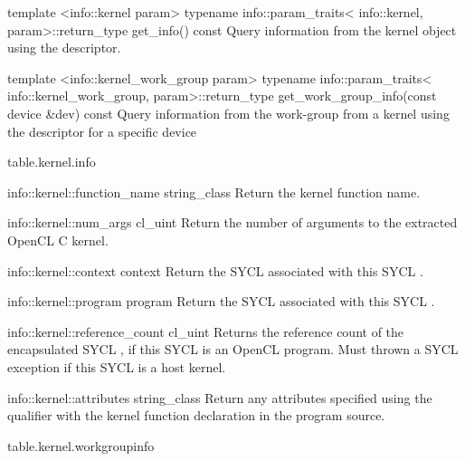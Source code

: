   \addRowFourL
    {template <info::kernel param>}
    {typename info::param_traits<}
    {info::kernel, param>::return_type}
    {get_info() const}
    {
        Query information from the kernel object using the
         descriptor.
    }


  \addRowFourL
    {template <info::kernel_work_group param>}
    {typename info::param_traits<}
    {info::kernel_work_group, param>::return_type}
    {get_work_group_info(const device \&dev) const}
    {
        Query information from the work-group from a kernel using the
         descriptor for a specific
        device
    }

\completeTable

{table.kernel.info}

\addInfoRow
{info::kernel::function_name}
{string_class}
{Return the kernel function name.}

\addInfoRow
{info::kernel::num_args}
{cl_uint}
{Return the number of arguments to the extracted OpenCL C kernel.}

\addInfoRow
{info::kernel::context}
{context}
{Return the SYCL  associated with this SYCL .}

\addInfoRow
{info::kernel::program}
{program}
{Return the SYCL  associated with this SYCL .}

\addInfoRow
{info::kernel::reference_count}
{cl_uint}
{
  Returns the reference count of the encapsulated SYCL ,
  if this SYCL  is an OpenCL program. Must thrown a  SYCL exception if this SYCL  is a host kernel.
}

\addInfoRow
{info::kernel::attributes}
{string_class}
{
  Return any attributes specified using the  qualifier
  with the kernel function declaration in the program source.
}

\completeInfoTable

{table.kernel.workgroupinfo}

